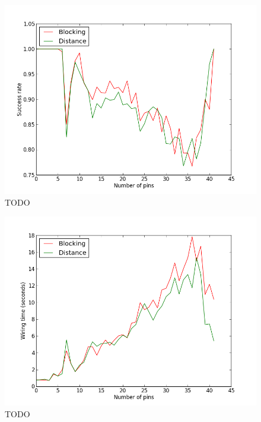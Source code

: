 \begin{figure}
\begin{center}
\includegraphics[width=\textwidth]{Images/placement_success_trend_comparison.png}
\caption{TODO}
\label{fig:placement_success_trend}
\end{center}
\end{figure}

\begin{figure}
\begin{center}
\includegraphics[width=\textwidth]{Images/placement_time_trend_comparison.png}
\caption{TODO}
\label{fig:placement_time_trend}
\end{center}
\end{figure}

